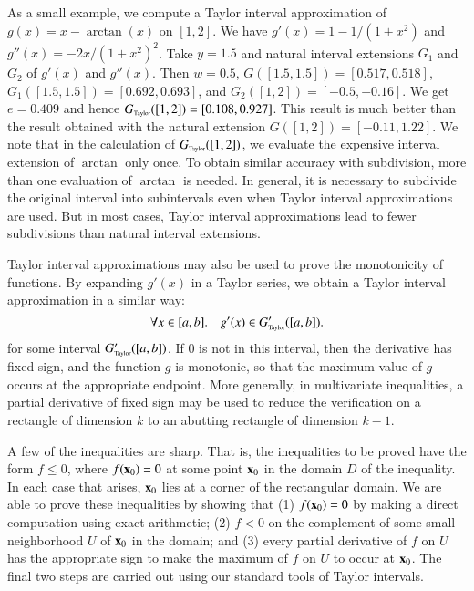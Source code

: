 As a small example, we compute a Taylor interval approximation of
$g(x) = x - \arctan(x)$ on $[1,2]$. We have $g'(x) = 1 - {1}/{(1 + x^2)}$ and $g''(x)
= {-2x}/{(1 + x^2)^2}$. Take $y = 1.5$ and natural interval
extensions $G_1$ and $G_2$ of $g'(x)$ and $g''(x)$. Then $w = 0.5$,
$G([1.5,1.5]) = [0.517,0.518]$, $G_1([1.5,1.5]) = [0.692,0.693]$, and
$G_2([1,2]) = [-0.5, -0.16]$. We get $e = 0.409$ and hence $G_{\hbox{\tiny Taylor}}([1,2])
= [0.108, 0.927]$. This result is much better than the result obtained
with the natural extension $G([1,2]) = [-0.11, 1.22]$. 
We note that in the calculation of $G_{\hbox{\tiny Taylor}}([1,2])$, we evaluate the
expensive interval extension of $\arctan$ only once.  To obtain
similar accuracy with subdivision, more than one evaluation of $\arctan$
is needed.  In general, it is necessary to subdivide the original
interval into subintervals even when Taylor interval approximations are
used. But in most cases, Taylor interval approximations lead to fewer
subdivisions than natural interval extensions.

Taylor interval approximations may also be used to
prove the monotonicity of functions.  By expanding $g'(x)$ in a 
Taylor series, we obtain a Taylor interval approximation in a similar way:
\begin{equation*}
\forall x \in [a,b]. \quad g'(x) \in G_{\hbox{\tiny Taylor}}'([a,b]).
\end{equation*}
for some interval $G_{\hbox{\tiny Taylor}}'([a,b])$.  If $0$ is not in this interval, then the
derivative has fixed sign, and
the function $g$ is monotonic, so that the maximum value of $g$ occurs
at the appropriate endpoint.  More generally, in multivariate inequalities,
a partial derivative of fixed sign may be used to reduce the verification on a
rectangle of dimension $k$ to an abutting rectangle of dimension $k-1$.

A few of the inequalities are sharp.  That is, the inequalities to be
proved have the form $f \le 0$, where $f({\bf x}_0)=0$ at some point ${\bf x}_0$
in the domain $D$ of the inequality.  In each case that arises, ${\bf x}_0$ lies at a
corner of the rectangular domain.  We are able to prove these
inequalities by showing that (1) $f({\bf x}_0) = 0$ by making a direct
computation using exact arithmetic; (2) $f < 0$ on the complement of
some small neighborhood $U$ of ${\bf x}_0$ in the domain; and (3) every
partial derivative of $f$ on $U$ has the appropriate sign to make the
maximum of $f$ on $U$ to occur at ${\bf x}_0$.  The final two steps are
carried out using our standard tools of Taylor intervals.

